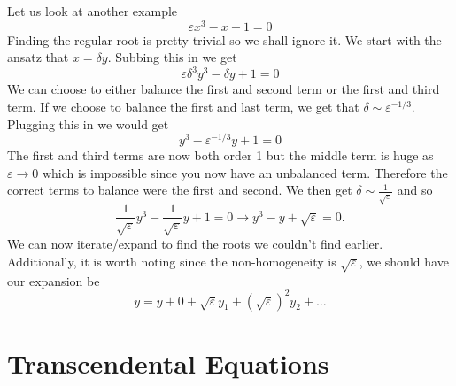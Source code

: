 \documentclass{article}
\begin{document}
Let us look at another example 
\begin{equation*}
    \varepsilon x^3-x+1=0
\end{equation*}
Finding the regular root is pretty trivial so we shall ignore it. We start with the ansatz that $x=\delta y$.
Subbing this in we get 
\begin{equation*}
    \varepsilon\delta^3y^3-\delta y+1=0
\end{equation*}
We can choose to either balance the first and second term or the first and third term. If we choose to balance the first and last term, we get that $\delta \sim \varepsilon^{-1/3}$. Plugging this in we would get 
\begin{equation*}
    y^3-\varepsilon^{-1/3}y+1=0
\end{equation*}
The first and third terms are now both order 1 but the middle term is huge as $\varepsilon\rightarrow0$ which is impossible since you now have an unbalanced term. Therefore the correct terms to balance were the first and second. We then get $\delta \sim \frac{1}{\sqrt \varepsilon}$ and so 
\begin{equation*}
    \frac{1}{\sqrt \varepsilon}y^3-\frac{1}{\sqrt \varepsilon}y+1=0 \rightarrow y^3-y+\sqrt \varepsilon =0.
\end{equation*}
We can now iterate/expand to find the roots we couldn't find earlier. Additionally, it is worth noting since the non-homogeneity is $\sqrt{\varepsilon}$, we should have our expansion be 
\begin{equation*}
    y=y+0+\sqrt \varepsilon y_1+(\sqrt \varepsilon)^2y_2+\ldots
\end{equation*}

\section{Transcendental Equations}
\end{document}
